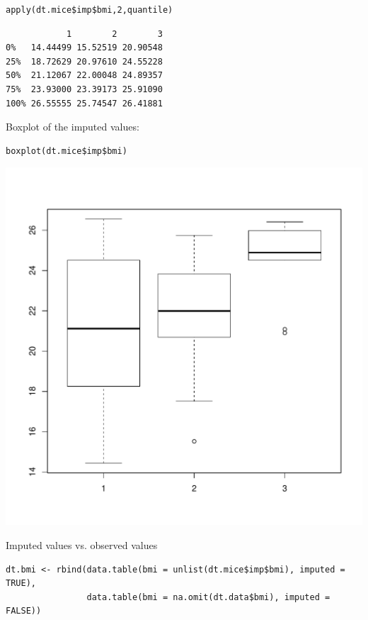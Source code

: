 \documentclass[12pt]{article}
\begin{document}
\lstset{language=r,label= ,caption= ,captionpos=b,numbers=none}
\begin{lstlisting}
apply(dt.mice$imp$bmi,2,quantile)
\end{lstlisting}

\begin{verbatim}
            1        2        3
0%   14.44499 15.52519 20.90548
25%  18.72629 20.97610 24.55228
50%  21.12067 22.00048 24.89357
75%  23.93000 23.39173 25.91090
100% 26.55555 25.74547 26.41881
\end{verbatim}

Boxplot of the imputed values:

\lstset{language=r,label= ,caption= ,captionpos=b,numbers=none}
\begin{lstlisting}
boxplot(dt.mice$imp$bmi)
\end{lstlisting}

\begin{center}
\includegraphics[width=.9\linewidth]{./boxplotImputed.pdf}
\end{center}

Imputed values vs. observed values
\lstset{language=r,label= ,caption= ,captionpos=b,numbers=none}
\begin{lstlisting}
dt.bmi <- rbind(data.table(bmi = unlist(dt.mice$imp$bmi), imputed = TRUE),
				data.table(bmi = na.omit(dt.data$bmi), imputed = FALSE))
\end{lstlisting}
\end{document}

